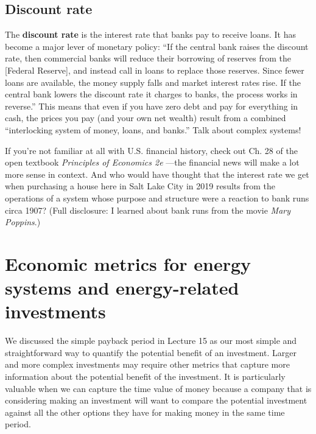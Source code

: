 \documentclass[10pt]{article}
\begin{document}
\subsection{Discount rate}

The \textbf{discount rate} is the interest rate that banks pay to receive loans. It has become a major lever of monetary policy: ``If the central bank raises the discount rate, then commercial banks will reduce their borrowing of reserves from the [Federal Reserve], and instead call in loans to replace those reserves. Since fewer loans are available, the money supply falls and market interest rates rise. If the central bank lowers the discount rate it charges to banks, the process works in reverse.'' \cite{Greenlaw2017} This means that even if you have zero debt and pay for everything in cash, the prices you pay (and your own net wealth) result from a combined ``interlocking system of money, loans, and banks.'' \cite{Greenlaw2017} Talk about complex systems!

If you're not familiar at all with U.S. financial history, check out Ch. 28 of the open textbook \textit{Principles of Economics 2e} \cite{Greenlaw2017} ---the financial news will make a lot more sense in context. And who would have thought that the interest rate we get when purchasing a house here in Salt Lake City in 2019 results from the operations of a system whose purpose and structure were a reaction to bank runs circa 1907? (Full disclosure: I learned about bank runs from the movie \textit{Mary Poppins}.) 



\section{Economic metrics for energy systems and energy-related investments}
\label{em}

   {}
\smallskip

We discussed the simple payback period in Lecture 15 as our most simple and straightforward way to quantify the potential benefit of an investment. Larger and more complex investments may require other metrics that capture more information about the potential benefit of the investment. It is particularly valuable when we can capture the time value of money because a company that is considering making an investment will want to compare the potential investment against all the other options they have for making money in the same time period. 
\end{document}
